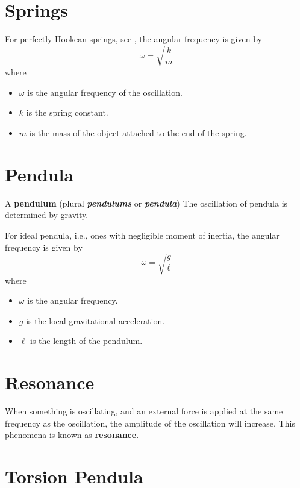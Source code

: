 \documentclass[a4paper, titlepage]{book}
\begin{document}
\section{Springs}

For perfectly Hookean springs,
see ,
the angular frequency is given by
\begin{equation}
    \omega = \sqrt{\frac{k}{m}}
\end{equation}
where
\begin{itemize}
    \item \(\omega\) is the angular frequency of the oscillation.
    \item \(k\) is the spring constant.
    \item \(m\) is the mass of the object attached to the end of the spring.
\end{itemize}

\section{Pendula}

A \textbf{pendulum} (plural \emph{\textbf{pendulums}} or \emph{\textbf{pendula}})
The oscillation of pendula is determined by gravity.

For ideal pendula, i.e., ones with negligible moment of inertia,
the angular frequency is given by
\begin{equation}
    \omega = \sqrt{\frac{g}{\ell}}
\end{equation}
where
\begin{itemize}
    \item \(\omega\) is the angular frequency.
    \item \(g\) is the local gravitational acceleration.
    \item \(\ell\) is the length of the pendulum.
\end{itemize}

\section{Resonance}

When something is oscillating,
and an external force is applied at the same frequency as the oscillation,
the amplitude of the oscillation will increase.
This phenomena is known as \textbf{resonance}.

\section{Torsion Pendula}
\end{document}
